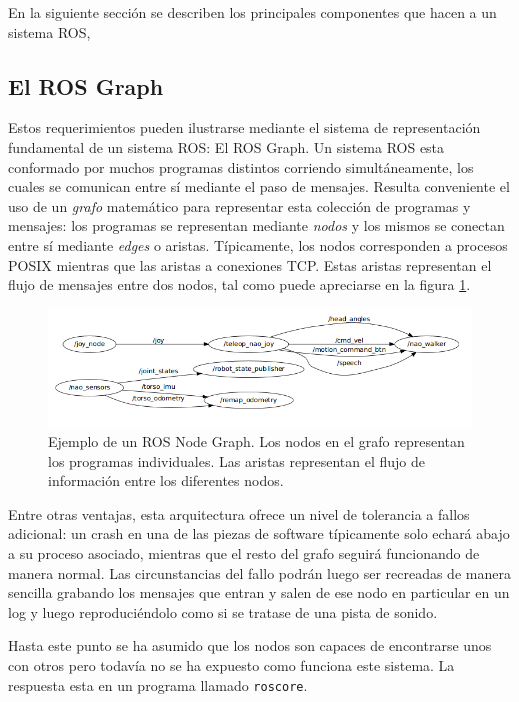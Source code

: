 En la siguiente sección se describen los principales componentes que hacen a un sistema ROS,

\subsection{El ROS Graph}

Estos requerimientos pueden ilustrarse mediante el sistema de representación fundamental de un sistema ROS: El ROS Graph. Un sistema ROS esta conformado por muchos programas distintos corriendo simultáneamente, los cuales se comunican entre sí mediante el paso de mensajes. Resulta conveniente el uso de un \textit{grafo} matemático para representar esta colección de programas y mensajes: los programas se representan mediante \textit{nodos} y los mismos se conectan entre sí mediante \textit{edges} o aristas. Típicamente, los nodos corresponden a procesos POSIX mientras que las aristas a conexiones TCP. Estas aristas representan el flujo de mensajes entre dos nodos, tal como puede apreciarse en la figura \ref{fig:rosNodeGraph}.

\begin{figure}[ht]
    \centering
    \includegraphics[scale=.6]{./Figures/ros_node_graph.png}
    \caption{Ejemplo de un ROS Node Graph. Los nodos en el grafo representan los programas individuales. Las aristas representan el flujo de información entre los diferentes nodos.}
    \label{fig:rosNodeGraph}
\end{figure}

Entre otras ventajas, esta arquitectura ofrece un nivel de tolerancia a fallos adicional: un crash en una de las piezas de software típicamente solo echará abajo a su proceso asociado, mientras que el resto del grafo seguirá funcionando de manera normal. Las circunstancias del fallo podrán luego ser recreadas de manera sencilla grabando los mensajes que entran y salen de ese nodo en particular en un log y luego reproduciéndolo como si se tratase de una pista de sonido.

Hasta este punto se ha asumido que los nodos son capaces de encontrarse unos con otros pero todavía no se ha expuesto como funciona este sistema. La respuesta esta en un programa llamado \texttt{roscore}.

